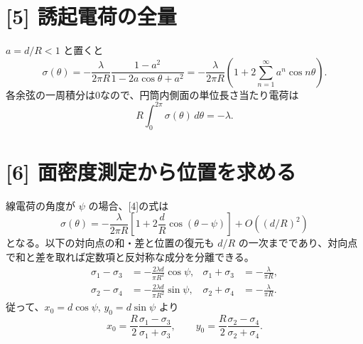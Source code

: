\documentclass[11pt,a4paper]{article}
\begin{document}
\section*{[5] 誘起電荷の全量}
$a=d/R<1$ と置くと
\begin{equation}
 \sigma(\theta)=-\frac{\lambda}{2\pi R}
 \frac{1-a^2}{1-2a\cos\theta+a^2}
 =-\frac{\lambda}{2\pi R}
 \left(1+2\sum_{n=1}^{\infty}a^n\cos n\theta\right).
\end{equation}
各余弦の一周積分は0なので、円筒内側面の単位長さ当たり電荷は
\begin{equation}
 \boxed{R\int_0^{2\pi}\sigma(\theta)\,d\theta=-\lambda}.
\end{equation}

\section*{[6] 面密度測定から位置を求める}
線電荷の角度が $\psi$ の場合、[4]の式は
\begin{equation}
 \sigma(\theta)=-\frac{\lambda}{2\pi R}
 \left[1+2\frac dR\cos(\theta-\psi)\right]
 +O\!\left((d/R)^2\right)
\end{equation}
となる。以下の対向点の和・差と位置の復元も $d/R$ の一次までであり、対向点で和と差を取れば定数項と反対称な成分を分離できる。
\begin{align}
 \sigma_1-\sigma_3&=-\frac{2\lambda d}{\pi R^2}\cos\psi,&
 \sigma_1+\sigma_3&=-\frac{\lambda}{\pi R},\\
 \sigma_2-\sigma_4&=-\frac{2\lambda d}{\pi R^2}\sin\psi,&
 \sigma_2+\sigma_4&=-\frac{\lambda}{\pi R}.
\end{align}
従って、$x_0=d\cos\psi$, $y_0=d\sin\psi$ より
\begin{equation}
 \boxed{x_0=\frac R2\frac{\sigma_1-\sigma_3}{\sigma_1+\sigma_3},\qquad
 y_0=\frac R2\frac{\sigma_2-\sigma_4}{\sigma_2+\sigma_4}.}
\end{equation}
\end{document}
